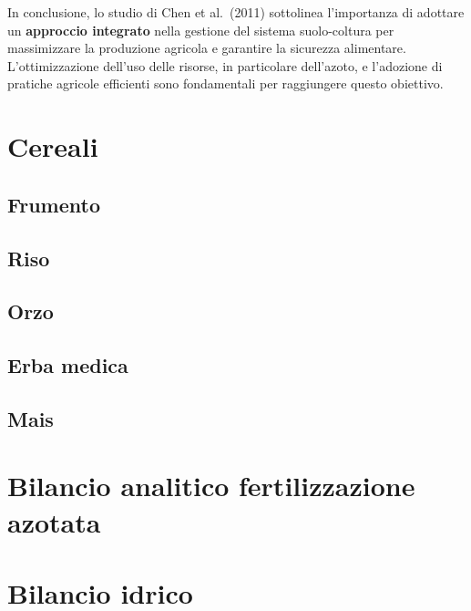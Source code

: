 \documentclass[
]{book}
\begin{document}
In conclusione, lo studio di Chen et al.~(2011) sottolinea l'importanza
di adottare un \textbf{approccio integrato} nella gestione del sistema
suolo-coltura per massimizzare la produzione agricola e garantire la
sicurezza alimentare. L'ottimizzazione dell'uso delle risorse, in
particolare dell'azoto, e l'adozione di pratiche agricole efficienti
sono fondamentali per raggiungere questo obiettivo.

\hypertarget{cereali}{%
\section{Cereali}\label{cereali}}

\hypertarget{frumento}{%
\subsection{Frumento}\label{frumento}}

\hypertarget{riso}{%
\subsection{Riso}\label{riso}}

\hypertarget{orzo}{%
\subsection{Orzo}\label{orzo}}

\hypertarget{erba-medica}{%
\subsection{Erba medica}\label{erba-medica}}

\hypertarget{mais}{%
\subsection{Mais}\label{mais}}

\hypertarget{bilancio-analitico-fertilizzazione-azotata}{%
\section{Bilancio analitico fertilizzazione
azotata}\label{bilancio-analitico-fertilizzazione-azotata}}

\hypertarget{bilancio-idrico}{%
\section{Bilancio idrico}\label{bilancio-idrico}}
\end{document}
